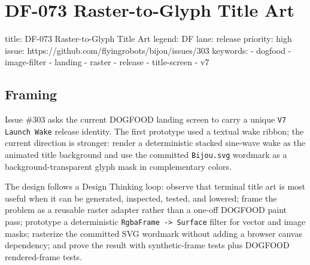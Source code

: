 \chapter{DF-073 Raster-to-Glyph Title Art}\label{record-113}

\smallskip

\begin{RecordMeta}
title: DF-073 Raster-to-Glyph Title Art
legend: DF
lane: release
priority: high
issue: https://github.com/flyingrobots/bijou/issues/303
keywords:
  - dogfood
  - image-filter
  - landing
  - raster
  - release
  - title-screen
  - v7

\end{RecordMeta}

\section{Framing}\label{record-113-framing}

Issue \#303 asks the current DOGFOOD landing screen to carry a unique \texttt{V\allowbreak{}7\allowbreak{} \allowbreak{}L\allowbreak{}a\allowbreak{}u\allowbreak{}n\allowbreak{}c\allowbreak{}h\allowbreak{} \allowbreak{}W\allowbreak{}a\allowbreak{}k\allowbreak{}e} release identity. The first prototype used a textual wake ribbon; the current direction is stronger: render a deterministic stacked sine-wave wake as the animated title background and use the committed \texttt{B\allowbreak{}i\allowbreak{}j\allowbreak{}o\allowbreak{}u\allowbreak{}.\allowbreak{}s\allowbreak{}v\allowbreak{}g} wordmark as a background-transparent glyph mask in complementary colors.

The design follows a Design Thinking loop: observe that terminal title art is most useful when it can be generated, inspected, tested, and lowered; frame the problem as a reusable raster adapter rather than a one-off DOGFOOD paint pass; prototype a deterministic \texttt{R\allowbreak{}g\allowbreak{}b\allowbreak{}a\allowbreak{}F\allowbreak{}r\allowbreak{}a\allowbreak{}m\allowbreak{}e\allowbreak{} \allowbreak{}-\allowbreak{}>\allowbreak{} \allowbreak{}S\allowbreak{}u\allowbreak{}r\allowbreak{}f\allowbreak{}a\allowbreak{}c\allowbreak{}e} filter for vector and image masks; rasterize the committed SVG wordmark without adding a browser canvas dependency; and prove the result with synthetic-frame tests plus DOGFOOD rendered-frame tests.

